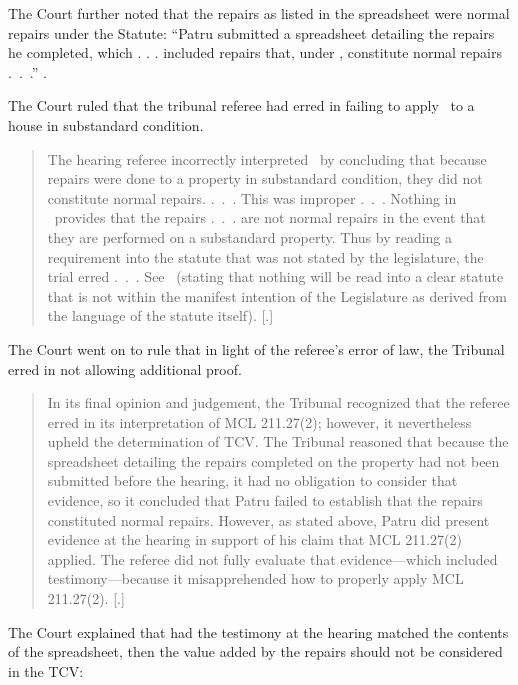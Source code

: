 \documentclass[12pt,\documentclassflag]{michiganCourtOfAppealsBrief}
\begin{document}
The Court further noted that the repairs as listed in the spreadsheet were normal repairs under the Statute: ``Patru submitted a spreadsheet detailing the repairs he completed, which . . . included repairs that, under \mathieuGast, constitute normal repairs .~.~.'' .

The Court ruled that the tribunal referee had erred in failing to apply \mathieuGast\ to a house in substandard condition.

\begin{quote}
  The hearing referee incorrectly interpreted \mathieuGast\ by concluding that because repairs were done to a property in substandard condition, they did not constitute normal repairs. .~.~. This was improper .~.~. Nothing in \mathieuGast\ provides that the repairs .~.~. are not normal repairs in the event that they are performed on a substandard property. Thus by reading a requirement into the statute that was not stated by the legislature, the trial erred .~.~. See \ (stating that nothing will be read into a clear statute that is not within the manifest intention of the Legislature as derived from the language of the statute itself).
  [.]
\end{quote}

The Court went on to rule that in light of the referee's error of law, the Tribunal erred in not allowing additional proof.

\begin{quote} In its final opinion and judgement, the Tribunal recognized that the referee erred in its
interpretation of MCL 211.27(2); however, it nevertheless upheld the determination of TCV.
The Tribunal reasoned that because the spreadsheet detailing the repairs completed on the
property had not been submitted before the hearing, it had no obligation to consider that
evidence, so it concluded that Patru failed to establish that the repairs constituted normal repairs.
However, as stated above, Patru did present evidence at the hearing in support of his claim that
MCL 211.27(2) applied. The referee did not fully evaluate that evidence—which included
testimony—because it misapprehended how to properly apply MCL 211.27(2).
  [.]
\end{quote}

The Court explained that had the testimony at the hearing matched the contents of the spreadsheet, then the value added by the repairs should not be considered in the TCV:
\end{document}
